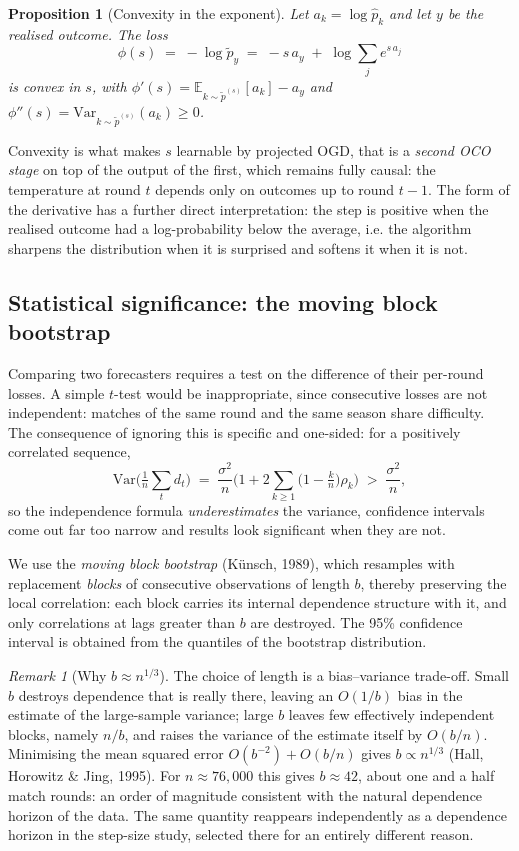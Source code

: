 \documentclass[12pt,a4paper,oneside]{report}
\renewcommand{\_}{\oldunderscore\allowbreak}
\theoremstyle{definition}
\theoremstyle{plain}
\newtheorem{proposition}[theorem]{Proposition}
\theoremstyle{remark}
\newtheorem{remark}[theorem]{Remark}
\begin{document}
\begin{proposition}[Convexity in the exponent]
\label{prop:temp-convex}
Let $a_k = \log \hat{p}_k$ and let $y$ be the realised outcome. The loss
\[
\phi(s) \;=\; -\log \tilde{p}_y \;=\; -s\,a_y \;+\; \log \sum_j e^{s\,a_j}
\]
is convex in $s$, with $\phi'(s) = \mathbb{E}_{k\sim \tilde{p}^{(s)}}[a_k] - a_y$ and
$\phi''(s) = \mathrm{Var}_{k\sim \tilde{p}^{(s)}}(a_k) \geq 0$.
\end{proposition}

Convexity is what makes $s$ learnable by projected OGD, that is a \emph{second OCO stage} on top
of the output of the first, which remains fully causal: the temperature at round $t$ depends only
on outcomes up to round $t-1$. The form of the derivative has a further direct interpretation:
the step is positive when the realised outcome had a log-probability below the average, i.e. the
algorithm sharpens the distribution when it is surprised and softens it when it is not.

\subsection{Statistical significance: the moving block bootstrap}
\label{sec:bootstrap-theory}

Comparing two forecasters requires a test on the difference of their per-round losses. A simple
$t$-test would be inappropriate, since consecutive losses are not independent: matches of the
same round and the same season share difficulty. The consequence of ignoring this is specific
and one-sided: for a positively correlated sequence,
\[
\mathrm{Var}\Big(\tfrac{1}{n}\sum_t d_t\Big) \;=\; \frac{\sigma^2}{n}
\Big( 1 + 2\sum_{k\geq 1} \big(1-\tfrac{k}{n}\big)\rho_k \Big) \;>\; \frac{\sigma^2}{n},
\]
so the independence formula \emph{underestimates} the variance, confidence intervals come out far
too narrow and results look significant when they are not.

We use the \emph{moving block bootstrap} (Künsch, 1989), which resamples with replacement
\emph{blocks} of consecutive observations of length $b$, thereby preserving the local
correlation: each block carries its internal dependence structure with it, and only correlations
at lags greater than $b$ are destroyed. The 95\% confidence interval is obtained from the
quantiles of the bootstrap distribution.

\begin{remark}[Why $b \approx n^{1/3}$]
\label{rem:blocklen}
The choice of length is a bias--variance trade-off. Small $b$ destroys dependence that is really
there, leaving an $O(1/b)$ bias in the estimate of the large-sample variance; large $b$ leaves
few effectively independent blocks, namely $n/b$, and raises the variance of the estimate itself
by $O(b/n)$. Minimising the mean squared error $O(b^{-2}) + O(b/n)$ gives $b \propto n^{1/3}$
(Hall, Horowitz \& Jing, 1995). For $n \approx 76{,}000$ this gives $b \approx 42$, about one and
a half match rounds: an order of magnitude consistent with the natural dependence horizon of
the data. The same quantity reappears independently as a dependence horizon in the step-size
study, selected there for an entirely different reason.
\end{remark}
\end{document}
